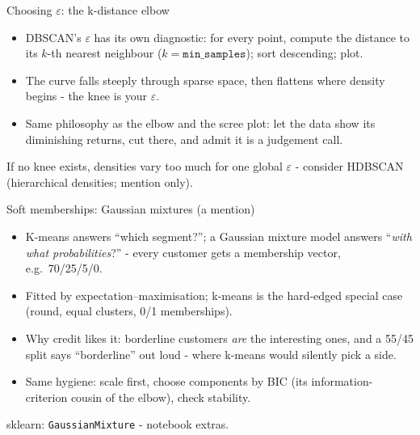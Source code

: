 \documentclass[10pt,aspectratio=169]{beamer}
\begin{document}
\begin{frame}{Choosing $\varepsilon$: the k-distance elbow}
  \begin{itemize}
    \item DBSCAN's $\varepsilon$ has its own diagnostic: for every point,
          compute the distance to its $k$-th nearest neighbour
          ($k = \texttt{min\_samples}$); sort descending; plot.
    \item The curve falls steeply through sparse space, then flattens where
          density begins - \alert{the knee is your $\varepsilon$}.
    \item Same philosophy as the elbow and the scree plot: let the data
          show its diminishing returns, cut there, and admit it is a
          judgement call.
  \end{itemize}
  \vspace{0.5em}
  \begin{center}\small
    If no knee exists, densities vary too much for one global
    $\varepsilon$ - consider HDBSCAN (hierarchical densities; mention
    only).
  \end{center}
\end{frame}

\begin{frame}{Soft memberships: Gaussian mixtures (a mention)}
  \begin{itemize}
    \item K-means answers ``which segment?''; a \alert{Gaussian mixture
          model} answers ``\emph{with what probabilities}?'' - every
          customer gets a membership vector, e.g.\ 70/25/5/0.
    \item Fitted by expectation--maximisation; k-means is the hard-edged
          special case (round, equal clusters, 0/1 memberships).
    \item Why credit likes it: borderline customers \emph{are} the
          interesting ones, and a 55/45 split says ``borderline'' out loud
          - where k-means would silently pick a side.
    \item Same hygiene: scale first, choose components by BIC (its
          information-criterion cousin of the elbow), check stability.
  \end{itemize}
  \vspace{0.4em}
  \begin{center}\small
    sklearn: \texttt{GaussianMixture} - notebook extras.
  \end{center}
\end{frame}
\end{document}
